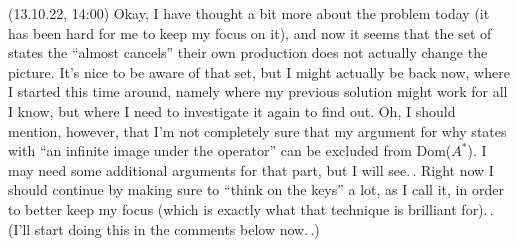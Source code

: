 \documentclass{report}
\begin{document}
(13.10.22, 14:00) Okay, I have thought a bit more about the problem today (it has been hard for me to keep my focus on it), and now it seems that the set of states the ``almost cancels'' their own production does not actually change the picture. It's nice to be aware of that set, but I might actually be back now, where I started this time around, namely where my previous solution might work for all I know, but where I need to investigate it again to find out. Oh, I should mention, however, that I'm not completely sure that my argument for why states with ``an infinite image under the operator'' can be excluded from Dom($A^*$). I may need some additional arguments for that part, but I will see.\,. Right now I should continue by making sure to ``think on the keys'' a lot, as I call it, in order to better keep my focus (which is exactly what that technique is brilliant for).\,. (I'll start doing this in the comments below now.\,.) %

\end{document}
